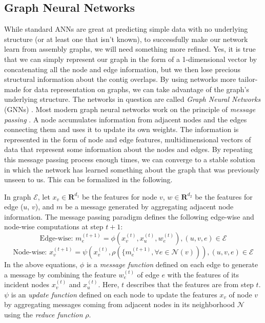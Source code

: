\documentclass[times, utf8, diplomski, english]{fer_eng}
\begin{document}
\subsection{Graph Neural Networks}
\label{subsec:graph neural networks}

While standard ANNs are great at predicting simple data with no underlying structure (or at least one that isn't known), to successfully make our network learn from assembly graphs, we will need something more refined. Yes, it is true that we can simply represent our graph in the form of a 1-dimensional vector by concatenating all the node and edge information, but we then lose precious structural information about the contig overlaps. By using networks more tailor-made for data representation on graphs, we can take advantage of the graph's underlying structure. The networks in question are called \textit{Graph Neural Networks} (GNNs) \cite{GNN}. Most modern graph neural networks work on the principle of \textit{message passing} \cite{message_passing}. A node accumulates information from adjacent nodes and the edges connecting them and uses it to update its own weights. The information is represented in the form of node and edge features, multidimensional vectors of data that represent some information about the nodes and edges. By repeating this message passing process enough times, we can converge to a stable solution in which the network has learned something about the graph that was previously unseen to us. This can be formalized in the following.

In graph $\mathcal{E}$, let $x_v \in \mathbf{R}^{d_1}$ be the features for node $v$, $w \in \mathbf{R}^{d_2}$ be the features for edge ($u$, $v$), and $m$ be a message generated by aggregating adjacent node information. The message passing paradigm defines the following edge-wise and node-wise computations at step $t+1$:
\[ \textrm{Edge-wise: } m_e^{(t+1)} = \phi (x_v^{(t)}, x_u^{(t)}, w_e^{(t)}), (u, v, e) \in \mathcal{E} \]
\[ \textrm{Node-wise: } x_v^{(t+1)} = \psi (x_v^{(t)}, \rho (\{m_e^{(t+1)}, \forall e \in \mathcal{N}(v))), (u, v, e) \in \mathcal{E} \]
In the above equations, $\phi$ is a \textit{message function} defined on each edge to generate a message by combining the feature $w_e^{(t)}$ of edge $e$ with the features of its incident nodes $x_v^{(t)}$ and $x_u^{(t)}$. Here, $t$ describes that the features are from step $t$. $\psi$ is an \textit{update function} defined on each node to update the features $x_v$ of node $v$ by aggregating messages coming from adjacent nodes in its neighborhood $\mathcal{N}$ using the \textit{reduce function} $\rho$.
\end{document}
